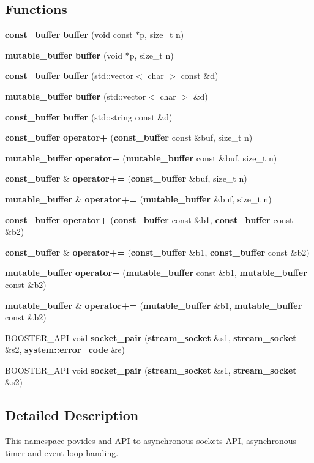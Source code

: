 \subsection*{\-Functions}
\begin{DoxyCompactItemize}
\item 
{\bf const\-\_\-buffer} {\bf buffer} (void const $\ast$p, size\-\_\-t n)
\item 
{\bf mutable\-\_\-buffer} {\bf buffer} (void $\ast$p, size\-\_\-t n)
\item 
{\bf const\-\_\-buffer} {\bf buffer} (std\-::vector$<$ char $>$ const \&d)
\item 
{\bf mutable\-\_\-buffer} {\bf buffer} (std\-::vector$<$ char $>$ \&d)
\item 
{\bf const\-\_\-buffer} {\bf buffer} (std\-::string const \&d)
\item 
{\bf const\-\_\-buffer} {\bf operator+} ({\bf const\-\_\-buffer} const \&buf, size\-\_\-t n)
\item 
{\bf mutable\-\_\-buffer} {\bf operator+} ({\bf mutable\-\_\-buffer} const \&buf, size\-\_\-t n)
\item 
{\bf const\-\_\-buffer} \& {\bf operator+=} ({\bf const\-\_\-buffer} \&buf, size\-\_\-t n)
\item 
{\bf mutable\-\_\-buffer} \& {\bf operator+=} ({\bf mutable\-\_\-buffer} \&buf, size\-\_\-t n)
\item 
{\bf const\-\_\-buffer} {\bf operator+} ({\bf const\-\_\-buffer} const \&b1, {\bf const\-\_\-buffer} const \&b2)
\item 
{\bf const\-\_\-buffer} \& {\bf operator+=} ({\bf const\-\_\-buffer} \&b1, {\bf const\-\_\-buffer} const \&b2)
\item 
{\bf mutable\-\_\-buffer} {\bf operator+} ({\bf mutable\-\_\-buffer} const \&b1, {\bf mutable\-\_\-buffer} const \&b2)
\item 
{\bf mutable\-\_\-buffer} \& {\bf operator+=} ({\bf mutable\-\_\-buffer} \&b1, {\bf mutable\-\_\-buffer} const \&b2)
\item 
\-B\-O\-O\-S\-T\-E\-R\-\_\-\-A\-P\-I void {\bf socket\-\_\-pair} ({\bf stream\-\_\-socket} \&s1, {\bf stream\-\_\-socket} \&s2, {\bf system\-::error\-\_\-code} \&e)
\item 
\-B\-O\-O\-S\-T\-E\-R\-\_\-\-A\-P\-I void {\bf socket\-\_\-pair} ({\bf stream\-\_\-socket} \&s1, {\bf stream\-\_\-socket} \&s2)
\end{DoxyCompactItemize}


\subsection{\-Detailed \-Description}
\-This namespace povides and \-A\-P\-I to asynchronous sockets \-A\-P\-I, asynchronous timer and event loop handing. 

